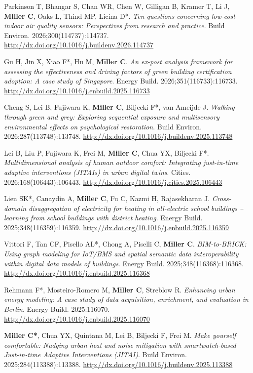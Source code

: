 \documentclass[10pt,a4paper]{article}
\begin{document}
\begin{small}
\begin{etaremune}
\item 
Parkinson T, Bhangar S, Chan WR, Chen W, Gilligan B, Kramer T, Li J, \textbf{Miller C}, Oaks L, Thind MP, Licina D*. \emph{Ten questions concerning low-cost indoor air quality sensors: Perspectives from research and practice}. Build Environ. 2026;300(114737):114737. \url{http://dx.doi.org/10.1016/j.buildenv.2026.114737}
\item 
Gu H, Jin X, Xiao F*, Hu M, \textbf{Miller C}. \emph{An ex-post analysis framework for assessing the effectiveness and driving factors of green building certification adoption: A case study of Singapore}. Energy Build. 2026;351(116733):116733. \url{http://dx.doi.org/10.1016/j.enbuild.2025.116733}
\item 
Cheng S, Lei B, Fujiwara K, \textbf{Miller C}, Biljecki F*, van Ameijde J. \emph{Walking through green and grey: Exploring sequential exposure and multisensory environmental effects on psychological restoration}. Build Environ. 2026;287(113748):113748. \url{http://dx.doi.org/10.1016/j.buildenv.2025.113748}
\item
Lei B, Liu P, Fujiwara K, Frei M, \textbf{Miller C}, Chua YX, Biljecki F*. \emph{Multidimensional analysis of human outdoor comfort: Integrating just-in-time adaptive interventions (JITAIs) in urban digital twins}. Cities. 2026;168(106443):106443. \url{http://dx.doi.org/10.1016/j.cities.2025.106443}
\item
Lien SK*, Canaydin A, \textbf{Miller C}, Fu C, Kazmi H, Rajasekharan J. \emph{Cross-domain disaggregation of electricity for heating in all-electric school buildings – learning from school buildings with district heating}. Energy Build. 2025;348(116359):116359. \url{http://dx.doi.org/10.1016/j.enbuild.2025.116359}
\item
Vittori F, Tan CF, Pisello AL*, Chong A, Piselli C, \textbf{Miller C}. \emph{BIM-to-BRICK: Using graph modeling for IoT/BMS and spatial semantic data interoperability within digital data models of buildings}. Energy Build. 2025;348(116368):116368. \url{http://dx.doi.org/10.1016/j.enbuild.2025.116368}
\item
Rehmann F*, Mosteiro-Romero M, \textbf{Miller C}, Streblow R. \emph{Enhancing urban energy modeling: A case study of data acquisition, enrichment, and evaluation in Berlin}. Energy Build. 2025:116070. \url{http://dx.doi.org/10.1016/j.enbuild.2025.116070}
\item
\textbf{Miller C*}, Chua YX, Quintana M, Lei B, Biljecki F, Frei M. \emph{Make yourself comfortable: Nudging urban heat and noise mitigation with smartwatch-based Just-in-time Adaptive Interventions (JITAI)}. Build Environ. 2025;284(113388):113388. \url{http://dx.doi.org/10.1016/j.buildenv.2025.113388}

\end{etaremune}
\end{small}
\end{document}
